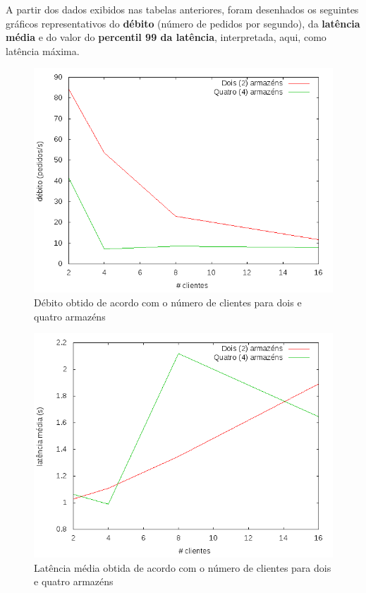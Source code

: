 A partir dos dados exibidos nas tabelas anteriores, foram desenhados os seguintes gráficos representativos do \textbf{débito} (número de pedidos por segundo), da \textbf{latência média} e do valor do \textbf{percentil 99 da latência}, interpretada, aqui, como latência máxima.

\begin{figure}[!h]
\centering
\includegraphics[scale=.4]{img/questao-1/ser-deb}
\caption{Débito obtido de acordo com o número de clientes para dois e quatro armazéns}
\end{figure}

\newpage

\begin{figure}[!h]
\centering
\includegraphics[scale=.4]{img/questao-1/ser-lat-med}
\caption{Latência média obtida de acordo com o número de clientes para dois e quatro armazéns}
\end{figure}

